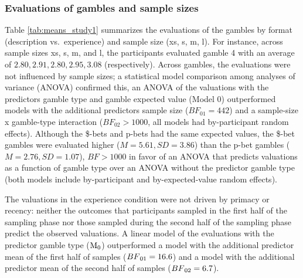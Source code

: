 \documentclass[
  a4paper, man, floatsintext]{apa6}
\author{Jana B. Jarecki}
\date{11 Mai, 2020}
\begin{document}
\subsubsection{Evaluations of gambles and sample sizes}

Table \ref{tab:means_study1} summarizes the evaluations of the gambles
by format (description vs.~experience) and sample size (xs, s, m, l).
For instance, across sample sizes xs, s, m, and l, the participants
evaluated gamble 4 with an average of \(2.80, 2.91, 2.80, 2.95, 3.08\)
(respectively). Across gambles, the evaluations were not influenced by
sample sizes; a statistical model comparison among analyses of variance
(ANOVA) confirmed this, an ANOVA of the valuations with the predictors
gamble type and gamble expected value (Model 0) outperformed models with
the additional predictors sample size (\(BF_{01} = 442\)) and a
sample-size x gamble-type interaction (\(BF_{02} > 1000\), all models
had by-participant random effects). Although the \$-bets and p-bets had
the same expected values, the \$-bet gambles were evaluated higher
(\(M=5.61, SD=3.86\)) than the p-bet gambles (\(M=2.76, SD=1.07\)),
\(BF > 1000\) in favor of an ANOVA that predicts valuations as a
function of gamble type over an ANOVA without the predictor gamble type
(both models include by-participant and by-expected-value random
effects).

The valuations in the experience condition were not driven by primacy or
recency: neither the outcomes that participants sampled in the first
half of the sampling phase nor those sampled during the second half of
the sampling phase predict the observed valuations. A linear model of
the evaluations with the predictor gamble type
(\(\mathrm{M}\textsubscript{0}\)) outperformed a model with the
additional predictor mean of the first half of samples
(\(BF\textsubscript{01} = 16.6\)) and a model with the additional
predictor mean of the second half of samples
(\(BF\textsubscript{02} = 6.7\)).

\end{document}
